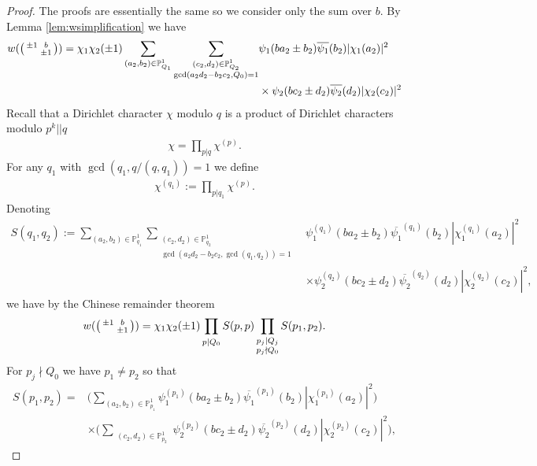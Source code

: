 \documentclass[12pt]{amsart}
\theoremstyle{definition}
\theoremstyle{remark}
\numberwithin{equation}{section}
\newcommand{\1}{{\mathbf 1}}
\renewcommand{\P}{\mathbb{P}}
\begin{document}
\begin{proof}
The proofs are essentially the same so we consider only the sum over $b$. By Lemma \ref{lem:wsimplification} we have
\begin{align*}
    w(\smqty(\pm 1 & b \\  & \pm 1))= \chi_1 \chi_2 (\pm 1)\sum_{(a_2,b_2) \in \P^{1}_{Q_1} } \sum_{\substack{(c_2,d_2) \in \P^{1}_{Q_2} \\ \gcd(a_2d_2-b_2c_2,Q_0)=1}  } &\psi_1(ba_2\pm b_2)  \overline{\psi_1 }(b_2) |\chi_1  (a_2 )|^2 \\
   &\times\psi_2 (b c_2 \pm d_2) \overline{  \psi_2} (d_2) |\chi_2 (c_2)|^2 
\end{align*}
Recall that a Dirichlet character $\chi$ modulo $q$ is a product of Dirichlet characters modulo $p^k || q$
\begin{align*}
    \chi = \prod_{p |q }\chi^{(p)}.
\end{align*}
For any  $q_1$ with $\gcd(q_1,q/(q,q_1))=1$  we define
\begin{align*}
    \chi^{(q_1)} :=  \prod_{p |q_1 } \chi^{(p)}.
\end{align*}
Denoting
\begin{align*}
  S(q_1,q_2) :=    \sum_{(a_2,b_2) \in \P^{1}_{q_1} } \sum_{\substack{(c_2,d_2) \in \P^{1}_{q_2} \\ \gcd(a_2d_2-b_2c_2,\gcd(q_1,q_2))=1}  }  &\psi_1^{(q_1)} (ba_2\pm b_2)  \overline{\psi_1}^{(q_1)}  (b_2) |\chi_1^{(q_1)}  (a_2 )|^2 \\
   &\times\psi_2^{(q_2)}  (b c_2 \pm d_2) \overline{  \psi_2}^{(q_2)}  (d_2) |\chi_2^{(q_2)}  (c_2)|^2,
\end{align*}
we have by the Chinese remainder theorem
\begin{align*}
    w(\smqty(\pm 1 & b \\  & \pm 1))= \chi_1 \chi_2 (\pm 1)  \prod_{\substack{ \\ p | Q_0}}  S(p,p)  \prod_{\substack{p_j | Q_j \\ p_j \nmid Q_0}}  S(p_1,p_2).
\end{align*}
For $p_j \nmid Q_0$ we have $p_1 \neq p_2$ so that
\begin{align*}
     S(p_1,p_2) = &\bigg(\sum_{(a_2,b_2) \in \P^1_{p_1} }  \psi_1^{(p_1)} (ba_2\pm b_2)  \overline{\psi_1}^{(p_1)}  (b_2) |\chi_1^{(p_1)}  (a_2 )|^2 \bigg)  \\
&\times\bigg(\sum_{\substack{(c_2,d_2) \in \P^1 _{p_2 } }} \psi_2^{(p_2)}  (b c_2 \pm d_2) \overline{  \psi_2}^{(p_2)}  (d_2) |\chi_2^{(p_2)}  (c_2)|^2 \bigg),  

\end{align*}
\end{proof}
\end{document}
